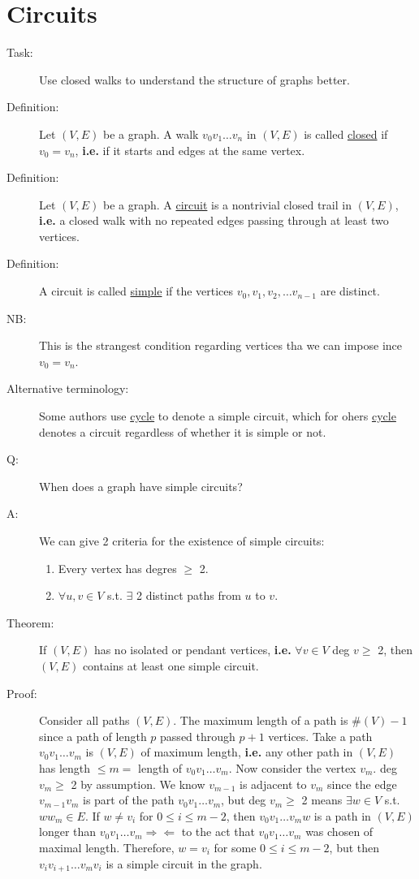 \documentclass[10pt]{article}
\begin{document}
	\section{Circuits}
	\begin{description}
		\item[Task:] Use closed walks to understand the structure of graphs better.
		\item[Definition:] Let $(V, E)$ be a graph. A walk $v_0 v_1 \dots v_n$ in $(V, E)$ is called \underline{closed} if $v_0 = v_n$, \textbf{i.e.} if it starts and edges at the same vertex.
		\item[Definition:] Let $(V, E)$ be a graph. A \underline{circuit} is a nontrivial closed trail in $(V, E)$, \textbf{i.e.} a closed walk with no repeated edges passing through at least two vertices.
		\item[Definition:] A circuit is called \underline{simple} if the vertices $v_0, v_1, v_2, \dots v_{n-1}$ are distinct.
		\item[NB:] This is the strangest condition regarding vertices tha we can impose ince $v_0 = v_n$.
		\item[Alternative terminology:] Some authors use \underline{cycle} to denote a simple circuit, which for ohers \underline{cycle} denotes a circuit regardless of whether it is simple or not.
		\item[Q:] When does a graph have simple circuits?
		\item[A:] We can give 2 criteria for the existence of simple circuits:
		\begin{enumerate}
			\item Every vertex has degres $\geq$ 2.
			\item $\forall u, v \in V$ s.t. $\exists$ 2 distinct paths from $u$ to $v$.
		\end{enumerate}
		\item[Theorem:] If $(V, E)$ has no isolated or pendant vertices, \textbf{i.e.} $\forall v \in V$ deg $v \geq$ 2, then $(V, E)$ contains at least one simple circuit.
		\item[Proof:] Consider all paths $(V, E)$. The maximum length of a path is $\#(V) - 1$ since a path of length $p$ passed through $p+1$ vertices. Take a path $v_0 v_1 \dots v_m$ is $(V, E)$ of maximum length, \textbf{i.e.} any other path in $(V, E)$ has length $\leq m = $ length of $v_0 v_1 \dots v_m$. Now consider the vertex $v_m$. deg $v_m \geq$ 2 by assumption. We know $v_{m-1}$ is adjacent to $v_m$ since the edge $v_{m-1} v_m$ is part of the path $v_0 v_1 \dots v_m$, but deg $v_m \geq $ 2 means $\exists w \in V$ s.t. $ww_m \in E$. If $w \neq v_i$ for $0 \leq i \leq m-2$, then $v_0 v_1 \dots v_m w$ is a path in $(V, E)$ longer than $v_0 v_1 \dots v_m \Rightarrow \Leftarrow$ to the act that $v_0 v_1 \dots v_m$ was chosen of maximal length. Therefore, $w = v_i$ for some $0 \leq i \leq m-2$, but then $v_i v_{i+1} \dots v_m v_i$ is a simple circuit in the graph.

\end{description}
\end{document}
